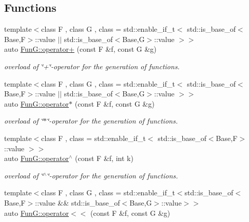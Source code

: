\subsection*{Functions}
\begin{DoxyCompactItemize}
\item 
{\footnotesize template$<$class F , class G , class  = std\+::enable\+\_\+if\+\_\+t$<$ std\+::is\+\_\+base\+\_\+of$<$\+Base,\+F$>$\+::value $\vert$$\vert$                                      std\+::is\+\_\+base\+\_\+of$<$\+Base,\+G$>$\+::value $>$$>$ }\\auto \hyperlink{namespaceFunG_ac7f61d48ff610ec4be8ee6994d165077}{Fun\+G\+::operator+} (const F \&f, const G \&g)
\begin{DoxyCompactList}\small\item\em overload of \char`\"{}+\char`\"{}-\/operator for the generation of functions. \end{DoxyCompactList}\item 
{\footnotesize template$<$class F , class G , class  = std\+::enable\+\_\+if\+\_\+t$<$ std\+::is\+\_\+base\+\_\+of$<$\+Base,\+F$>$\+::value $\vert$$\vert$ std\+::is\+\_\+base\+\_\+of$<$\+Base,\+G$>$\+::value $>$$>$ }\\auto \hyperlink{namespaceFunG_a014be932d3b4eb377d8e60271e864438}{Fun\+G\+::operator$\ast$} (const F \&f, const G \&g)
\begin{DoxyCompactList}\small\item\em overload of \char`\"{}$\ast$\char`\"{}-\/operator for the generation of functions. \end{DoxyCompactList}\item 
{\footnotesize template$<$class F , class  = std\+::enable\+\_\+if\+\_\+t$<$ std\+::is\+\_\+base\+\_\+of$<$\+Base,\+F$>$\+::value $>$$>$ }\\auto \hyperlink{namespaceFunG_aeb22ff63cd78cb63d81b601c656da2c1}{Fun\+G\+::operator$^\wedge$} (const F \&f, int k)
\begin{DoxyCompactList}\small\item\em overload of \char`\"{}$^\wedge$\char`\"{}-\/operator for the generation of functions. \end{DoxyCompactList}\item 
{\footnotesize template$<$class F , class G , class  = std\+::enable\+\_\+if\+\_\+t$<$std\+::is\+\_\+base\+\_\+of$<$\+Base,\+F$>$\+::value \&\&                                     std\+::is\+\_\+base\+\_\+of$<$\+Base,\+G$>$\+::value$>$$>$ }\\auto \hyperlink{namespaceFunG_a56701b5e83b96d2d6cc5c482e36caa39}{Fun\+G\+::operator$<$$<$} (const F \&f, const G \&g)

\end{DoxyCompactItemize}
